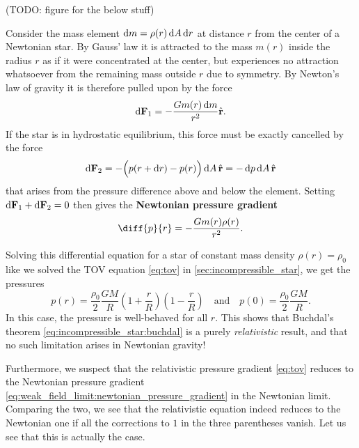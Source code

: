 (TODO: figure for the below stuff)

Consider the mass element $\mathop{}\!\mathrm{d} m = \rho(r) \mathop{}\!\mathrm{d} A \mathop{}\!\mathrm{d} r$ at distance $r$ from the center of a Newtonian star.
By Gauss' law it is attracted to the mass $m(r)$ inside the radius $r$ as if it were concentrated at the center, but experiences no attraction whatsoever from the remaining mass outside $r$ due to symmetry.
By Newton's law of gravity it is therefore pulled upon by the force
\begin{equation}
	\mathop{}\!\mathrm{d} \mathbf{F}_1 = -\frac{G m(r) \mathop{}\!\mathrm{d} m}{r^2} \hat{\textbf{r}} .
	\label{eq:weak_field_limit:force_newton}
\end{equation}
If the star is in hydrostatic equilibrium, this force must be exactly cancelled by the force
\begin{equation}
	\mathop{}\!\mathrm{d} \textbf{F}_2 = - \Big( p(r + \mathop{}\!\mathrm{d} r) - p(r) \Big) \mathop{}\!\mathrm{d} A \, \hat{\textbf{r}} = -\mathop{}\!\mathrm{d} p \mathop{}\!\mathrm{d} A \, \hat{\textbf{r}}
	\label{eq:weak_field_limit:force_pressure}
\end{equation}
that arises from the pressure difference above and below the element.
Setting $\mathop{}\!\mathrm{d} \textbf{F}_1 + \mathop{}\!\mathrm{d} \textbf{F}_2 = 0$ then gives the \textbf{Newtonian pressure gradient}
\begin{equation}
	\diff{p}{r} = -\frac{G m(r) \rho(r)}{r^2} .
	\label{eq:weak_field_limit:newtonian_pressure_gradient}
\end{equation}

Solving this differential equation for a star of constant mass density $\rho(r) = \rho_0$ like we solved the TOV equation \eqref{eq:tov} in \cref{sec:incompressible_star}, we get the pressures
\begin{equation}
	p(r) = \frac{\rho_0}{2} \frac{G M}{R} \left( 1 + \frac{r}{R} \right) \left( 1 - \frac{r}{R} \right)
	\quad \text{and} \quad
	p(0) = \frac{\rho_0}{2} \frac{GM}{R} .
	\label{eq:weak_field_limit:newtonian_pressure}
\end{equation}
In this case, the pressure is well-behaved for all $r$.
This shows that Buchdal's theorem \eqref{eq:incompressible_star:buchdal} is a purely \emph{relativistic} result, and that no such limitation arises in Newtonian gravity!


Furthermore, we suspect that the relativistic pressure gradient \eqref{eq:tov} reduces to the Newtonian pressure gradient \eqref{eq:weak_field_limit:newtonian_pressure_gradient} in the Newtonian limit.
Comparing the two, we see that the relativistic equation indeed reduces to the Newtonian one if all the corrections to $1$ in the three parentheses vanish.
Let us see that this is actually the case.

